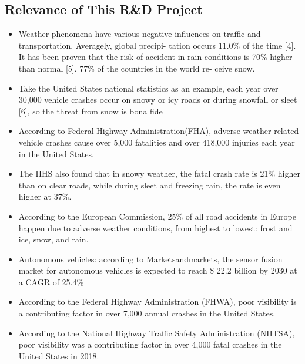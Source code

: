 \documentclass[rnd]{mas_proposal}
\begin{document}
\subsection{Relevance of This R\&D Project}
\begin{itemize}

    \item Weather phenomena have various negative influences on traffic and transportation. Averagely, global precipi- tation occurs 11.0\% of the time [4]. It has been proven that the risk of accident in rain conditions is 70\% higher than normal [5]. 77\% of the countries in the world re- ceive snow.
    
    \item Take the United States national statistics as an example, each year over 30,000 vehicle crashes occur on snowy or icy roads or during snowfall or sleet [6], so the threat from snow is bona fide

    \item According to Federal Highway Administration(FHA), adverse weather-related vehicle crashes cause over 5,000 fatalities and over 418,000 injuries each year in the United States. 
    \cite{federal-highway-administration-no-date}

    \item The IIHS also found that in snowy weather, the fatal crash rate is 21\% higher than on clear roads, while during sleet and freezing rain, the rate is even higher at 37\%.

    \item According to the European Commission, 25\% of all road accidents in Europe happen due to adverse weather conditions, from highest to lowest: frost and ice, snow, and rain.
    \cite{cookson-2022}

    \item Autonomous vehicles: according to Marketsandmarkets, the sensor fusion market for autonomous vehicles is expected to reach \$ 22.2 billion by 2030 at a CAGR of 25.4\%  
    \cite{marketsandmarkets}

    \item According to the Federal Highway Administration (FHWA), poor visibility is a contributing factor in over 7,000 annual crashes in the United States.
    
    \item According to the National Highway Traffic Safety Administration (NHTSA), poor visibility was a contributing factor in over 4,000 fatal crashes in the United States in 2018.
    

\end{itemize}
\end{document}
